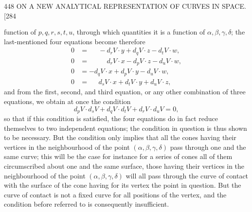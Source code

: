 \documentclass[11pt]{article}
\begin{document}
\begin{center}
448 \hfill ON A NEW ANALYTICAL REPRESENTATION OF CURVES IN SPACE. \hfill \textsc{[284}
\end{center}

function of $p,q,r,s,t,u$, through which quantities it is a function of $\alpha,\beta,\gamma,\delta$;
the last-mentioned four equations become therefore
\begin{align*}
0 &= \phantom{-}\, -d_{r}V\cdot y + d_{q}V\cdot z - d_{t}V\cdot w,\\
0 &= \phantom{-}\, \phantom{-}d_{r}V\cdot x - d_{p}V\cdot z - d_{u}V\cdot w,\\
0 &= -d_{q}V\cdot x + d_{p}V\cdot y - d_{u}V\cdot w,\\
0 &= \phantom{-}\, d_{s}V\cdot x + d_{t}V\cdot y + d_{u}V\cdot z,
\end{align*}
and from the first, second, and third equation, or any other combination of three
equations, we obtain at once the condition
\[ d_{p}V\cdot d_{s}V+d_{q}V\cdot d_{t}V+d_{r}V\cdot d_{u}V=0, \]
so that if this condition is satisfied, the four equations do in fact reduce
themselves to two independent equations; the condition in question is thus shown to
be necessary. But the condition only implies that all the cones having their vertices
in the neighbourhood of the point $(\alpha,\beta,\gamma,\delta)$ pass through one and
the same curve; this will be the case for instance for a series of cones all of them
circumscribed about one and the same surface, those having their vertices in the
neighbourhood of the point $(\alpha,\beta,\gamma,\delta)$ will all pass through the
curve of contact with the surface of the cone having for its vertex the point in
question. But the curve of contact is not a fixed curve for all positions of the
vertex, and the condition before referred to is consequently insufficient.
\end{document}
